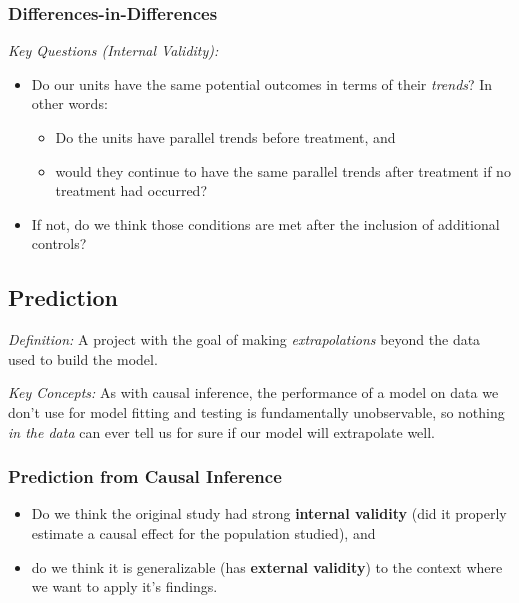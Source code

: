 \documentclass[12pt]{article}
\begin{document}
\subsubsection*{Differences-in-Differences}
\emph{Key Questions (Internal Validity):}
\begin{itemize}
    \item Do our units have the same potential outcomes in terms of their \emph{trends}? In other words:
    \begin{itemize}
        \item Do the units have parallel trends before treatment, and
        \item would they continue to have the same parallel trends after treatment if no treatment had occurred?
    \end{itemize}
    \item If not, do we think those conditions are met after the inclusion of additional controls?
\end{itemize}

\subsection*{Prediction}

\emph{Definition:} A project with the goal of making \emph{extrapolations} beyond the data used to build the model.

\emph{Key Concepts:} As with causal inference, the performance of a model on data we don't use for model fitting and testing is fundamentally unobservable, so nothing \emph{in the data} can ever tell us for sure if our model will extrapolate well.

\subsubsection*{Prediction from Causal Inference}
\begin{itemize}
    \item Do we think the original study had strong \textbf{internal validity} (did it properly estimate a causal effect for the population studied), and
    \item do we think it is generalizable (has \textbf{external validity}) to the context where we want to apply it's findings.
\end{itemize}
\end{document}
